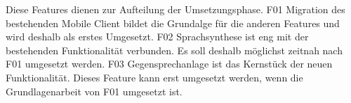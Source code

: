 Diese Features dienen zur Aufteilung der Umsetzungsphase.
F01 Migration des bestehenden Mobile Client bildet die Grundalge für die anderen Features und wird deshalb als erstes Umgesetzt.
F02 Sprachsynthese ist eng mit der bestehenden Funktionalität verbunden.
Es soll deshalb möglichst zeitnah nach F01 umgesetzt werden.
F03 Gegensprechanlage ist das Kernstück der neuen Funktionalität.
Dieses Feature kann erst umgesetzt werden, wenn die Grundlagenarbeit von F01 umgesetzt ist.


\clearpage
